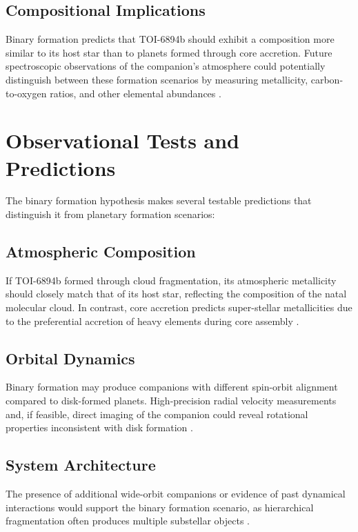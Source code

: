 \documentclass[12pt]{article}
\begin{document}
\subsection{Compositional Implications}

Binary formation predicts that TOI-6894b should exhibit a composition more similar to its host star than to planets formed through core accretion. Future spectroscopic observations of the companion's atmosphere could potentially distinguish between these formation scenarios by measuring metallicity, carbon-to-oxygen ratios, and other elemental abundances \citep{oberg2011effects, madhusudhan2017exoplanetary}.

\section{Observational Tests and Predictions}

The binary formation hypothesis makes several testable predictions that distinguish it from planetary formation scenarios:

\subsection{Atmospheric Composition}

If TOI-6894b formed through cloud fragmentation, its atmospheric metallicity should closely match that of its host star, reflecting the composition of the natal molecular cloud. In contrast, core accretion predicts super-stellar metallicities due to the preferential accretion of heavy elements during core assembly \citep{thorngren2016probabilistic}.

\subsection{Orbital Dynamics}

Binary formation may produce companions with different spin-orbit alignment compared to disk-formed planets. High-precision radial velocity measurements and, if feasible, direct imaging of the companion could reveal rotational properties inconsistent with disk formation \citep{albrecht2012obliquities}.

\subsection{System Architecture}

The presence of additional wide-orbit companions or evidence of past dynamical interactions would support the binary formation scenario, as hierarchical fragmentation often produces multiple substellar objects \citep{reipurth2001multiplicity}.
\end{document}
